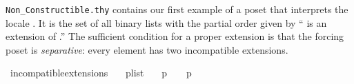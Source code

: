 \verb|Non_Constructible.thy| contains our first example of a poset
that interprets the locale
. It is the set of all binary
lists with the partial order given by  `` is an extension of
.'' The sufficient condition for a proper extension is that
the forcing poset is \emph{separative}: every element has two
incompatible extensions.

\begin{isabelle}
\isamarkupfalse%
\ incompatible{\isacharunderscore}extensions{\isacharcolon}\isanewline
\ \ \ {\isachardoublequoteopen}p{\isasymin}list{\isacharparenleft}{}{\isacharparenright}{\isachardoublequoteclose}\isanewline
\ \ \ {\isachardoublequoteopen}{\isacharparenleft}p\ {\isacharat}\ {\isacharbrackleft}{}{\isacharbrackright}{\isacharparenright}\ {\isasymbottom}\ {\isacharparenleft}p\ {\isacharat}\ {\isacharbrackleft}{}{\isacharbrackright}{\isacharparenright}{\isachardoublequoteclose}
\end{isabelle}
 
